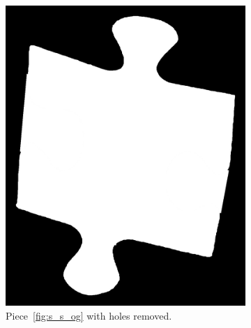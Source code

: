 \documentclass{article}
\begin{document}
\begin{figure}
\begin{subfigure}{0.3\textwidth}
    \includegraphics[width=\linewidth]{pictures/piece_with_no_hole.png}
    \caption{Piece~\ref{fig:s_s_og} with holes removed.}
    \label{fig:s_s_no_holes}
  \end{subfigure}
  \hfill
  \begin{subfigure}{0.3\textwidth}
    \centering

\end{subfigure}
\end{figure}
\end{document}
